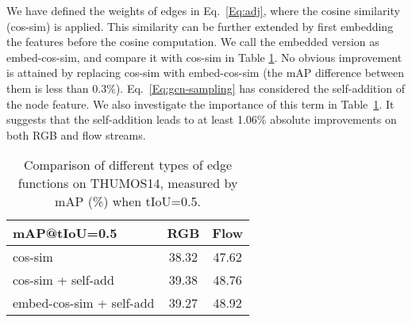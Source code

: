 \documentclass[10pt,journal,compsoc]{IEEEtran}
\begin{document}
	We have defined the weights of edges in Eq.~\eqref{Eq:adj}, where the cosine similarity (cos-sim) is applied. This similarity can be further extended by first embedding the features before the cosine computation. We call the embedded version as embed-cos-sim, and compare it with cos-sim in Table \ref{Tab:edge}. 
	No obvious improvement is attained by replacing cos-sim with embed-cos-sim (the mAP difference between them is less than $0.3\%$). Eq.~\eqref{Eq:gcn-sampling} has considered the self-addition of the node feature. We also investigate the importance of this term in Table~\ref{Tab:edge}. It suggests that the self-addition leads to at least 1.06\% absolute improvements on both RGB and flow streams.
			\begin{table}[!tb]
		\caption{Comparison of different types of edge functions on THUMOS14, measured by mAP (\%) when tIoU=0.5.}
		\centering
		\begin{tabular}{l|cc}
			\hline
			mAP@tIoU=0.5                & RGB      & Flow      \\ \hline
			cos-sim   & 38.32    & 47.62   \\
			cos-sim + self-add    & 39.38  & 48.76 \\ 
			embed-cos-sim + self-add   & 39.27   & 48.92 \\ \hline 
		\end{tabular}
		\label{Tab:edge}
	\end{table}
	
\end{document}
